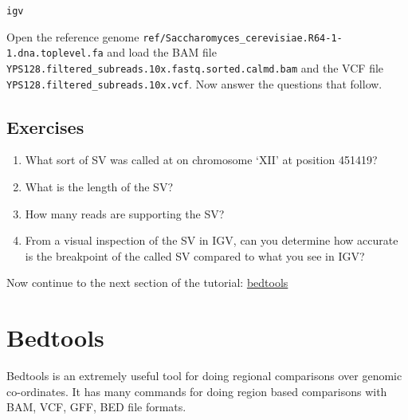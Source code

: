 \documentclass[11pt]{article}
\makeatletter
\providecommand{\tightlist}{%
      \setlength{\itemsep}{0pt}\setlength{\parskip}{0pt}}
\newcommand{\boxspacing}{\kern\kvtcb@left@rule\kern\kvtcb@boxsep}
\newcommand{\prompt}[4]{
        {\ttfamily\llap{{\color{blue}\LARGE\faKeyboardO\hspace{3pt}#4}}\vspace{-\baselineskip}}
    }
\makeatother
\begin{document}
    \begin{tcolorbox}[breakable, size=fbox, boxrule=1pt, pad at break*=1mm,colback=cellbackground, colframe=cellborder]
\prompt{In}{incolor}{ }{\boxspacing}
\begin{Verbatim}[commandchars=\\\{\}]
igv
\end{Verbatim}
\end{tcolorbox}

    Open the reference genome
\texttt{ref/Saccharomyces\_cerevisiae.R64-1-1.dna.toplevel.fa} and load
the BAM file
\texttt{YPS128.filtered\_subreads.10x.fastq.sorted.calmd.bam} and the
VCF file \texttt{YPS128.filtered\_subreads.10x.vcf}. Now answer the
questions that follow.

    \hypertarget{exercises}{%
\subsection{Exercises}\label{exercises}}

\begin{enumerate}
\def\labelenumi{\arabic{enumi}.}
\tightlist
\item
  What sort of SV was called at on chromosome `XII' at position 451419?
\item
  What is the length of the SV?
\item
  How many reads are supporting the SV?
\item
  From a visual inspection of the SV in IGV, can you determine how
  accurate is the breakpoint of the called SV compared to what you see
  in IGV?
\end{enumerate}

    Now continue to the next section of the tutorial:
\href{bedtools.ipynb}{bedtools}





\newpage





    \hypertarget{bedtools}{%
\section{Bedtools}\label{bedtools}}

Bedtools is an extremely useful tool for doing regional comparisons over
genomic co-ordinates. It has many commands for doing region based
comparisons with BAM, VCF, GFF, BED file formats.
\end{document}
